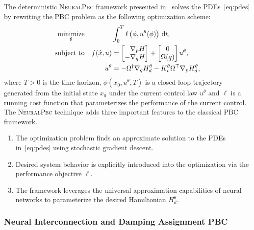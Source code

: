 The deterministic \textsc{NeuralPbc} framework presented in~\cite{neuralpbc}
solves the PDEs~\eqref{eq:pdes} by rewriting the PBC problem as the following 
optimization scheme:
\begin{equation}
  \begin{aligned}
      \underset{\theta}{\textrm{minimize}} 
      & & &\int_{0}^{T} \ell \left(\phi,u^{\theta}(\phi) \right) \, \dd t , \\%
      \textrm{subject to}
      & & f(\hat{x}, u) &= \bmat{\phantom{-}\nabla_p H \\ -\nabla_q H} + \bmat{0 \\ \Omega(q)}u^{\theta}, \\%
      & & u^{\theta} &= -\Omega^{\dagger} \nabla_q H_d^{\theta} - K_v^{\theta} \Omega^\top \nabla_p H_d^{\theta},%
  \end{aligned}
  \label{eq:neural_pbc_finite_optim}
\end{equation}
where $T>0$ is the time horizon, $\phi( x_0, u^\theta, T)$ is a closed-loop
trajectory generated from the initial state $x_0$ under the current control law
$u^\theta$ and $\ell$ is a running cost function that parameterizes the
performance of the current control.
%
The \textsc{NeuralPbc} technique adds three important features to the classical 
PBC framework.
\begin{enumerate}
  \item The optimization problem finds an approximate solution to the PDEs
  in~\eqref{eq:pdes} using stochastic gradient descent.
  \item Desired system behavior is explicitly introduced into the optimization
  via the performance objective $\ell$.
  \item The framework leverages the universal approximation capabilities of
  neural networks to parameterize the desired Hamiltonian $H^\theta_d$.
\end{enumerate}

\subsubsection{Neural Interconnection and Damping Assignment PBC}


